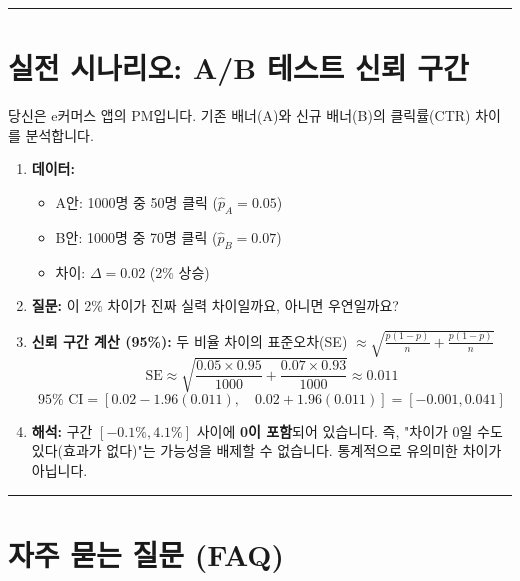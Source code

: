 \documentclass[11pt,a4paper]{book}
\theoremstyle{definition}
\begin{document}
\vspace{0.5cm}\hrule\vspace{0.5cm}

\section{실전 시나리오: A/B 테스트 신뢰 구간}

\begin{storybox}[title={Scenario: 웹사이트 배너 클릭률 비교}]
당신은 e커머스 앱의 PM입니다. 기존 배너(A)와 신규 배너(B)의 클릭률(CTR) 차이를 분석합니다.
\end{storybox}

\begin{enumerate}
    \item \textbf{데이터:} \begin{itemize}
        \item A안: 1000명 중 50명 클릭 ($\hat{p}_A = 0.05$)
        \item B안: 1000명 중 70명 클릭 ($\hat{p}_B = 0.07$)
        \item 차이: $\Delta = 0.02$ (2\% 상승)
    \end{itemize}
    
    \item \textbf{질문:} 이 2\% 차이가 진짜 실력 차이일까요, 아니면 우연일까요?
    
    \item \textbf{신뢰 구간 계산 (95\%):}
    두 비율 차이의 표준오차(SE) $\approx \sqrt{\frac{p(1-p)}{n} + \frac{p(1-p)}{n}}$
    $$ \text{SE} \approx \sqrt{\frac{0.05 \times 0.95}{1000} + \frac{0.07 \times 0.93}{1000}} \approx 0.011 $$
    $$ 95\% \text{ CI} = [0.02 - 1.96(0.011), \quad 0.02 + 1.96(0.011)] = [-0.001, 0.041] $$
    
    \item \textbf{해석:} 구간 $[-0.1\%, 4.1\%]$ 사이에 \textbf{0이 포함}되어 있습니다.
    즉, "차이가 0일 수도 있다(효과가 없다)"는 가능성을 배제할 수 없습니다. 통계적으로 유의미한 차이가 아닙니다.
\end{enumerate}

\vspace{0.5cm}\hrule\vspace{0.5cm}

\section{자주 묻는 질문 (FAQ)}
\end{document}
